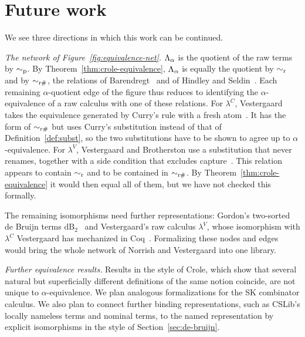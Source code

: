 \section{Future work}
\label{sec:future-work}

We see three directions in which this work can be continued.

\emph{The network of Figure~\ref{fig:equivalence-net}.} $\Lambda_{\alpha}$ is the
quotient of the raw terms by $\sim_{\mathrm{p}}$.
By Theorem~\ref{thm:crole-equivalence}, $\Lambda_{\alpha}$ is equally the
quotient by $\sim_{\mathrm{r}}$ and by $\sim_{\mathrm{r}\#}$, the relations of
Barendregt~\cite[Definition~2.1.11]{barendregt1985a} and of
Hindley and Seldin~\cite[Definition~1.17]{hindley2008a}. Each
remaining $\alpha$-quotient edge of the figure thus reduces to
identifying the $\alpha$-equivalence of a raw calculus with one of
these relations. For $\lambda^{C}$, Vestergaard takes the equivalence
generated by Curry's rule with a fresh
atom~\cite[Section~1.2]{vestergaard2003a}. It has the form of
$\sim_{\mathrm{r}\#}$ but uses Curry's substitution instead of that of
Definition~\ref{def:subst}, so the two substitutions have to be shown
to agree up to $\alpha$-equivalence. For $\lambda^{V}$, Vestergaard and
Brotherston use a substitution that never renames, together with a
side condition that excludes capture~\cite[Figures~1 and~2]{vestergaard2003b}.
This relation appears to contain $\sim_{\mathrm{r}}$ and to be contained in
$\sim_{\mathrm{r}\#}$. By Theorem~\ref{thm:crole-equivalence} it would then equal
all of them, but we have not checked this formally.

The remaining isomorphisms need further representations: Gordon's
two-sorted de Bruijn terms $\mathrm{dB}_2$~\cite{gordon1994a} and
Vestergaard's raw calculus $\lambda^{V}$, whose isomorphism with
$\lambda^{C}$ Vestergaard has mechanized in Coq~\cite[Section~2.3]{norrish2007a}.
Formalizing these nodes and edges would bring the whole network of
Norrish and Vestergaard into one library.

\emph{Further equivalence results.} Results in the style of Crole,
which show that several natural but superficially different definitions
of the same notion coincide, are not unique to $\alpha$-equivalence. We
plan analogous formalizations for the SK combinator calculus. We also
plan to connect further binding representations, such as CSLib's
locally nameless terms and nominal terms, to the named representation
by explicit isomorphisms in the style of Section~\ref{sec:de-bruijn}.

